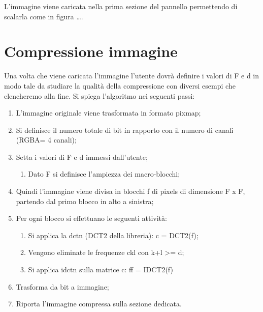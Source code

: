 \documentclass[12pt]{article}
\begin{document}
	L’immagine viene caricata nella prima sezione del pannello permettendo di scalarla come in figura ….

\section{Compressione immagine}
	Una volta che viene caricata l’immagine l’utente dovrà definire i valori di F e d in modo tale da studiare la qualità della compressione con diversi esempi che elencheremo alla fine.\newline
	Si spiega l’algoritmo nei seguenti passi:
	\begin{enumerate}
			\item L’immagine originale viene trasformata in formato pixmap;
			\item Si definisce il numero totale di bit in rapporto con il numero di canali (RGBA= 4 canali);
			\item Setta i valori di F e d immessi dall’utente;
				\begin{enumerate}[label=\Alph*]
					\item Dato F si definisce l’ampiezza dei macro-blocchi;
				\end{enumerate}
			\item Quindi l’immagine viene divisa in blocchi f di pixels di dimensione F x F, partendo dal primo blocco in alto a sinistra;
			\item Per ogni blocco si effettuano le seguenti attività:
				\begin{enumerate}[label=\Alph*]
					\item Si applica la dctn (DCT2 della libreria): c = DCT2(f);
					\item Vengono eliminate le frequenze ckl con k+l >= d;	
					\item Si applica idctn sulla matrice c: ff = IDCT2(f)	
				\end{enumerate}
			\item Trasforma da bit a immagine;
			\item Riporta l’immagine compressa sulla sezione dedicata.
	\end{enumerate}
\end{document}
